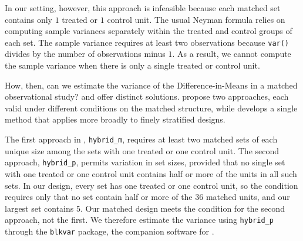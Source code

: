 \documentclass[
  12pt,
  leqno]{article}
\newenvironment{Shaded}{\begin{snugshade}}{\end{snugshade}}
\newcommand{\AttributeTok}[1]{\textcolor[rgb]{0.13,0.29,0.53}{#1}}
\newcommand{\CommentTok}[1]{\textcolor[rgb]{0.56,0.35,0.01}{\textit{#1}}}
\newcommand{\FunctionTok}[1]{\textcolor[rgb]{0.13,0.29,0.53}{\textbf{#1}}}
\newcommand{\NormalTok}[1]{#1}
\newcommand{\OtherTok}[1]{\textcolor[rgb]{0.56,0.35,0.01}{#1}}
\newcommand{\SpecialCharTok}[1]{\textcolor[rgb]{0.81,0.36,0.00}{\textbf{#1}}}
\newcommand{\StringTok}[1]{\textcolor[rgb]{0.31,0.60,0.02}{#1}}
\begin{document}
In our setting, however, this approach is infeasible because each
matched set contains only \(1\) treated or \(1\) control unit. The usual
Neyman formula relies on computing sample variances separately within
the treated and control groups of each set. The sample variance requires
at least two observations because \texttt{var()} divides by the number
of observations minus \(1\). As a result, we cannot compute the sample
variance when there is only a single treated or control unit.

How, then, can we estimate the variance of the Difference-in-Means in a
matched observational study? \citet{pashleymiratrix2021} and
\citet{fogarty2018} offer distinct solutions.
\citet{pashleymiratrix2021} propose two approaches, each valid under
different conditions on the matched structure, while \citet{fogarty2018}
develops a single method that applies more broadly to finely stratified
designs.

The first approach in \citet{pashleymiratrix2021}, \texttt{hybrid\_m},
requires at least two matched sets of each unique size among the sets
with one treated or one control unit. The second approach,
\texttt{hybrid\_p}, permits variation in set sizes, provided that no
single set with one treated or one control unit contains half or more of
the units in all such sets. In our design, every set has one treated or
one control unit, so the condition requires only that no set contain
half or more of the 36 matched units, and our largest set contains 5.
Our matched design meets the condition for the second approach, not the
first. We therefore estimate the variance using \texttt{hybrid\_p}
through the \texttt{blkvar} package, the companion software for
\citet{pashleymiratrix2021}.

\singlespacing

\begin{Shaded}
\end{Shaded}
\end{document}

